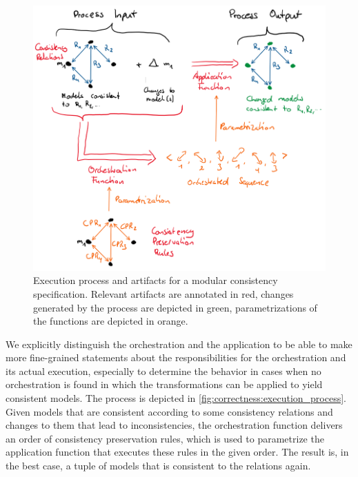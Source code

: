 \begin{figure}
    \centering
    \includegraphics[width=\textwidth]{figures/correctness/notion/execution_process.png}
    \caption[Modular consistency specification execution process and artifacts]{Execution process and artifacts for a modular consistency specification. Relevant artifacts are annotated in red, changes generated by the process are depicted in green, parametrizations of the functions are depicted in orange.}
    \label{fig:correctness:execution_process}
\end{figure}

We explicitly distinguish the orchestration and the application to be able to make more fine-grained statements about the responsibilities for the orchestration and its actual execution, especially to determine the behavior in cases when no orchestration is found in which the transformations can be applied to yield consistent models.
The process is depicted in \autoref{fig:correctness:execution_process}. Given models that are consistent according to some consistency relations and changes to them that lead to inconsistencies, the orchestration function delivers an order of consistency preservation rules, which is used to parametrize the application function that executes these rules in the given order.
The result is, in the best case, a tuple of models that is consistent to the relations again.

